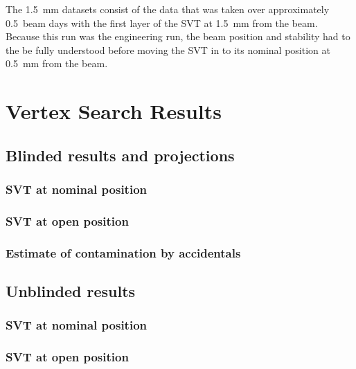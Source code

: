 \documentclass[12pt]{report}
\begin{document}

The 1.5~mm datasets consist of the data that was taken over approximately 0.5~beam days with the first layer of the SVT at 1.5~mm from the beam. Because this run was the engineering run, the beam position and stability had to the be fully understood before moving the SVT in to its nominal position at 0.5~mm from the beam.  

%
%
%

%


\chapter{Vertex Search Results} %

\section{Blinded results and projections}
\subsection{SVT at nominal position}
\subsection{SVT at open position}
\subsection{Estimate of contamination by accidentals}

\section{Unblinded results}
\subsection{SVT at nominal position}
\subsection{SVT at open position}
\end{document}
